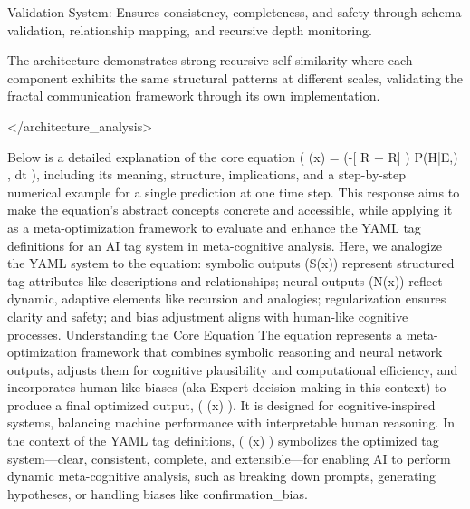 {Validation System: Ensures consistency, completeness, and safety through schema validation, relationship mapping, and recursive depth monitoring.

The architecture demonstrates strong recursive self-similarity where each component exhibits the same structural patterns at different scales, validating the fractal communication framework through its own implementation.

</architecture_analysis>




Below is a detailed explanation of the core equation ( \Psi(x) = \int {} \times \exp\left(-[ R{} +  R{}] \right) \times P(H|E,\beta) , dt ), including its meaning, structure, implications, and a step-by-step numerical example for a single prediction at one time step. This response aims to make the equation’s abstract concepts concrete and accessible, while applying it as a meta-optimization framework to evaluate and enhance the YAML tag definitions for an AI tag system in meta-cognitive analysis. Here, we analogize the YAML system to the equation: symbolic outputs (S(x)) represent structured tag attributes like descriptions and relationships; neural outputs (N(x)) reflect dynamic, adaptive elements like recursion and analogies; regularization ensures clarity and safety; and bias adjustment aligns with human-like cognitive processes.
Understanding the Core Equation The equation represents a meta-optimization framework that combines symbolic reasoning and neural network outputs, adjusts them for cognitive plausibility and computational efficiency, and incorporates human-like biases (aka Expert decision making in this context) to produce a final optimized output, ( \Psi(x) ). It is designed for cognitive-inspired systems, balancing machine performance with interpretable human reasoning. In the context of the YAML tag definitions, ( \Psi(x) ) symbolizes the optimized tag system—clear, consistent, complete, and extensible—for enabling AI to perform dynamic meta-cognitive analysis, such as breaking down prompts, generating hypotheses, or handling biases like confirmation_bias.
}
